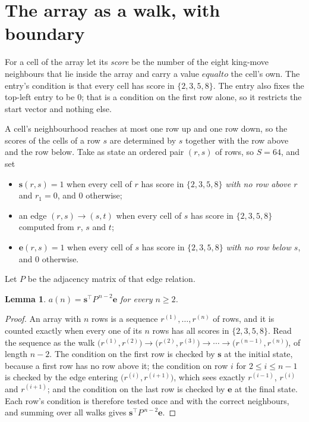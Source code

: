 \documentclass[11pt,a4paper]{article}
\theoremstyle{plain}
\newtheorem{lemma}[theorem]{Lemma}
\theoremstyle{definition}
\begin{document}
\section{The array as a walk, with boundary}

For a cell of the array let its \emph{score} be the number of the eight king-move neighbours that lie inside
the array and carry a value $equal to$ the cell's own. The entry's condition is that every cell
has score in $\{2,3,5,8\}$. The entry also fixes the top-left entry to be $0$; that is a condition on the first row alone, so it restricts the start vector and nothing else.

A cell's neighbourhood reaches at most one row up and one row down, so the scores of the
cells of a row $s$ are determined by $s$ together with the row above and the row below.
Take as state an ordered pair $(r,s)$ of rows, so $S=64$, and set
\begin{itemize}
\item $\mathbf{s}(r,s)=1$ when every cell of $r$ has score in $\{2,3,5,8\}$ \emph{with no row
above $r$} and $r_1=0$, and $0$ otherwise;
\item an edge $(r,s)\to(s,t)$ when every cell of $s$ has score in $\{2,3,5,8\}$ computed from
$r$, $s$ and $t$;
\item $\mathbf{e}(r,s)=1$ when every cell of $s$ has score in $\{2,3,5,8\}$ \emph{with no row
below $s$}, and $0$ otherwise.
\end{itemize}
Let $P$ be the adjacency matrix of that edge relation.

\begin{lemma}\label{lem:walk}
$a(n)=\mathbf{s}^{\!\top}P^{\,n-2}\mathbf{e}$ for every $n\ge2$.
\end{lemma}

\begin{proof}
An array with $n$ rows is a sequence $r^{(1)},\dots,r^{(n)}$ of rows, and it is counted
exactly when every one of its $n$ rows has all scores in $\{2,3,5,8\}$. Read the sequence as the
walk $\bigl(r^{(1)},r^{(2)}\bigr)\to\bigl(r^{(2)},r^{(3)}\bigr)\to\cdots\to
\bigl(r^{(n-1)},r^{(n)}\bigr)$, of length $n-2$. The condition on the first row is
checked by $\mathbf{s}$ at the initial state, because a first row has no row above it; the
condition on row $i$ for $2\le i\le n-1$ is checked by the edge entering
$\bigl(r^{(i)},r^{(i+1)}\bigr)$, which sees exactly $r^{(i-1)}$, $r^{(i)}$ and
$r^{(i+1)}$; and the condition on the last row is checked by $\mathbf{e}$ at the final
state. Each row's condition is therefore tested once and with the correct neighbours, and
summing over all walks gives $\mathbf{s}^{\!\top}P^{\,n-2}\mathbf{e}$.
\end{proof}
\end{document}
